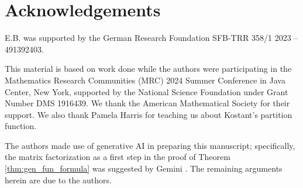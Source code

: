 \documentclass{amsart}
\theoremstyle{definition}
\begin{document}
\section*{Acknowledgements}

E.B. was supported by the German Research Foundation SFB-TRR 358/1 2023 – 491392403.

This material is based on work done while the authors were participating in the Mathematics Research Communities (MRC) 2024
Summer Conference in Java Center, New York, supported by the National Science Foundation under Grant Number DMS 1916439. 
We thank the American Mathematical Society for their support. We also thank Pamela Harris for teaching us about Kostant's partition function.

The authors made use of generative AI in preparing this manuscript; specifically, the matrix factorization as a first step in the proof of Theorem \ref{thm:gen_fun_formula} was suggested by Gemini \cite{gemini}. The remaining arguments herein are due to the authors.




\end{document}
